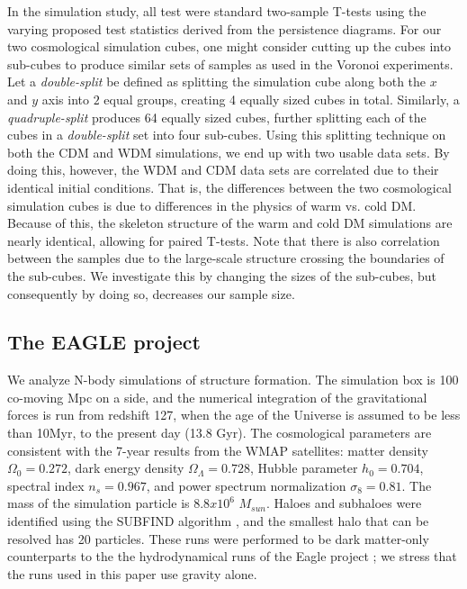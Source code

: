 \documentclass[12pt]{article}
\begin{document}
In the simulation study, all test were standard two-sample T-tests  using the varying proposed test statistics derived from the persistence diagrams.  For our two cosmological simulation cubes, one might consider cutting up the cubes into sub-cubes to produce similar sets of samples as used in the Voronoi experiments. Let a \textit{double-split} be defined as splitting the simulation cube along both the $x$ and $y$ axis into $2$ equal groups, creating 4 equally sized cubes in total. Similarly, a \textit{quadruple-split} produces 64 equally sized cubes, further splitting each of the cubes in a \textit{double-split} set into four sub-cubes. Using this splitting technique on both the CDM and WDM simulations, we end up with two usable data sets. By doing this, however, the WDM and CDM data sets are correlated due to their identical initial conditions.  That is, the differences between the two cosmological simulation cubes is due to differences in the physics of warm vs. cold DM.  Because of this, the skeleton structure of the warm and cold DM simulations are nearly identical, allowing for paired T-tests.  Note that there is also correlation between the samples due to the large-scale structure crossing the boundaries of the sub-cubes.  We investigate this by changing the sizes of the sub-cubes, but consequently by doing so, decreases our sample size.

\subsection{The EAGLE project}
We analyze N-body simulations of structure formation. The simulation box is 100 co-moving Mpc on a side, and the numerical integration of the gravitational forces is run from redshift 127, when the age of the Universe is assumed to be less than 10Myr, to the present day (13.8 Gyr). The cosmological parameters are consistent with the 7-year results from the WMAP satellites: matter density $\Omega_0 = 0.272$, dark energy density $\Omega_{\Lambda} = 0.728$, Hubble parameter $h_0 = 0.704$, spectral index $n_s=0.967$, and power spectrum normalization $\sigma_8=0.81$. The mass of the simulation particle is $8.8x10^6$ $M_{sun}$. Haloes and subhaloes were identified using the SUBFIND algorithm \citep{springel2001populating}, and the smallest halo that can be resolved has 20 particles. These runs were performed to be dark matter-only counterparts to the the hydrodynamical runs of the Eagle project \citep{schaye2015eagle}; we stress that the runs used in this paper use gravity alone. 
\end{document}
